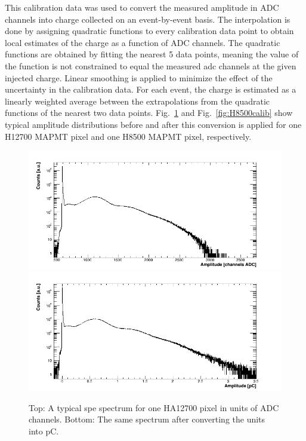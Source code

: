 This calibration data was used to convert the measured amplitude in ADC channels into charge collected on an event-by-event basis. The interpolation is done by assigning quadratic functions to every calibration data point to obtain local estimates of the charge as a function of ADC channels. The quadratic functions are obtained by fitting the nearest 5 data points, meaning the value of the function is not constrained to equal the measured adc channels at the given injected charge. Linear smoothing is applied to minimize the effect of the uncertainty in the calibration data. For each event, the charge is estimated as a linearly weighted average between the extrapolations from the quadratic functions of the nearest two data points. Fig.~\ref{fig:H12700calib} and Fig.~\ref{fig:H8500calib} show typical amplitude distributions before and after this conversion is applied for one H12700 MAPMT pixel and one H8500 MAPMT pixel, respectively.

\begin{figure}[hbt]
	\centering
	\includegraphics[width=\linewidth]{figures/GA0982_w1_g064_v1100_063_adc.png}
	\includegraphics[width=\linewidth]{figures/GA0982_w1_g064_v1100_063_pC.png}	
	\caption{Top: A typical spe spectrum for one HA12700 pixel in units of ADC channels. Bottom: The same spectrum after converting the units into pC.}
	\label{fig:H12700calib}
\end{figure}

